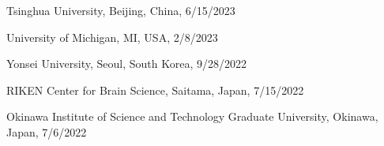 \documentclass[11pt,letter]{article}
\renewenvironment{itemize}{
  \begin{list}{}{
    \setlength{\leftmargin}{1.5em}
    \setlength{\itemsep}{0.25em}
    \setlength{\parskip}{0pt}
    \setlength{\parsep}{0.25em}
  }
}{
  \end{list}
}
\begin{document}
\begin{itemize}
\item
Tsinghua University, Beijing, China, 6/15/2023

\item
University of Michigan, MI, USA, 2/8/2023





\item
Yonsei University, Seoul, South Korea, 9/28/2022

\item
RIKEN Center for Brain Science, Saitama, Japan, 7/15/2022

\item
Okinawa Institute of Science and Technology Graduate University, Okinawa, Japan, 7/6/2022


\end{itemize}
\end{document}

